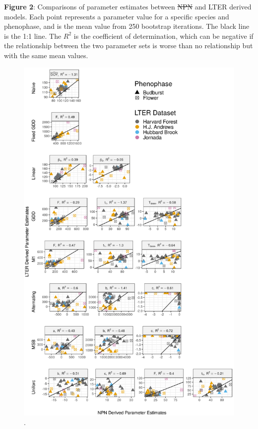 \documentclass[fleqn,12pt,lineno]{article}
\providecommand{\DIFadd}[1]{{\protect\color{blue}\uwave{#1}}} %
\providecommand{\DIFdel}[1]{{\protect\color{red}\sout{#1}}}                      %
\providecommand{\DIFaddbegin}{} %
\providecommand{\DIFaddend}{} %
\providecommand{\DIFdelbegin}{} %
\providecommand{\DIFdelend}{} %
\begin{document}

\newpage

\textbf{Figure 2}: Comparisons of parameter estimates between \DIFdelbegin \DIFdel{NPN }\DIFdelend \DIFaddbegin \DIFadd{USA-NPN }\DIFaddend and LTER derived models. Each point represents a parameter value for a specific species and phenophase, and is the mean value from 250 bootstrap iterations. The black line is the 1:1 line. The $R^2$ is the coefficient of determination, which can be negative if the relationship between the two parameter sets is worse than no relationship but with the same mean values.

\newpage

\begin{figure}[H]
	\centering
		\includegraphics[scale=0.65]{figure_param_comparison.png}
    \caption{.}
\end{figure}
\end{document}
